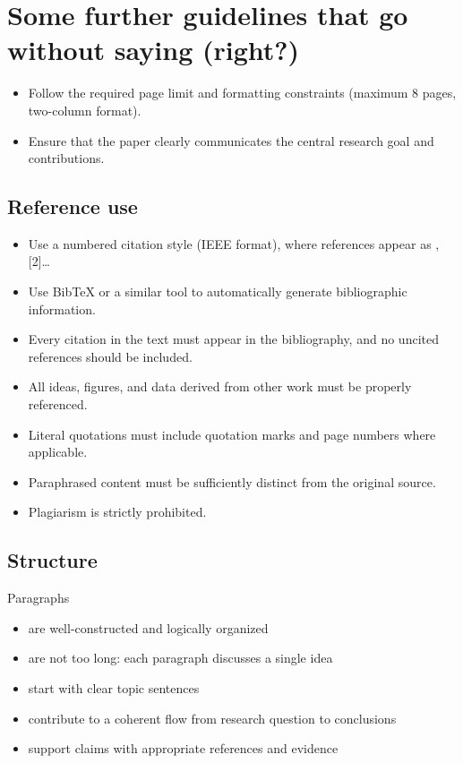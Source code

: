 \appendix
\section{Some further guidelines that go without saying (right?)}

\begin{itemize}
  \item Follow the required page limit and formatting constraints (maximum 8 pages, two-column format).
  \item Ensure that the paper clearly communicates the central research goal and contributions.
\end{itemize}

\subsection{Reference use}
\begin{itemize}
  \item Use a numbered citation style (IEEE format), where references appear as \cite{example}, [2]\ldots
  \item Use BibTeX or a similar tool to automatically generate bibliographic information.
  \item Every citation in the text must appear in the bibliography, and no uncited references should be included.
  \item All ideas, figures, and data derived from other work must be properly referenced.
  \item Literal quotations must include quotation marks and page numbers where applicable.
  \item Paraphrased content must be sufficiently distinct from the original source.
  \item Plagiarism is strictly prohibited.
\end{itemize}

\subsection{Structure}
Paragraphs
\begin{itemize}
  \item are well-constructed and logically organized
  \item are not too long: each paragraph discusses a single idea
  \item start with clear topic sentences
  \item contribute to a coherent flow from research question to conclusions
  \item support claims with appropriate references and evidence
\end{itemize}

